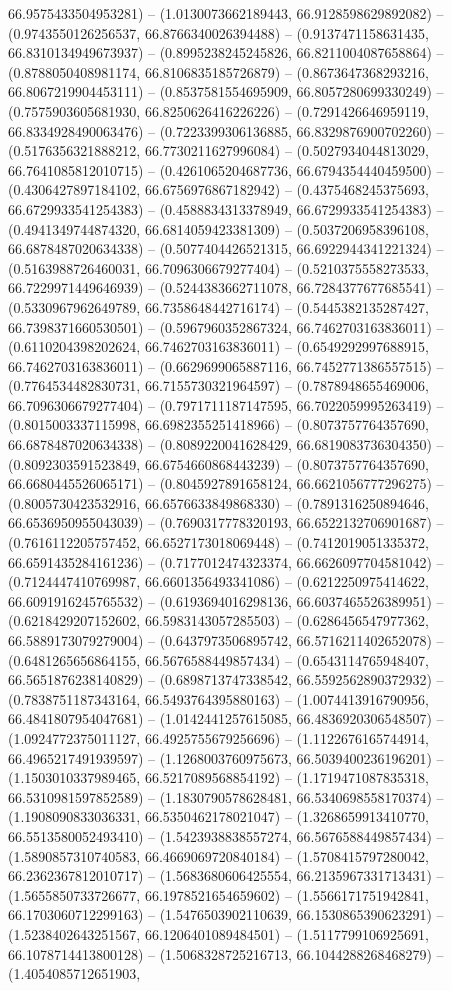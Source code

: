 66.9575433504953281) -- (1.0130073662189443, 66.9128598629892082) -- (0.9743550126256537, 66.8766340026394488) -- (0.9137471158631435, 66.8310134949673937) -- (0.8995238245245826, 66.8211004087658864) -- (0.8788050408981174, 66.8106835185726879) -- (0.8673647368293216, 66.8067219904453111) -- (0.8537581554695909, 66.8057280699330249) -- (0.7575903605681930, 66.8250626416226226) -- (0.7291426646959119, 66.8334928490063476) -- (0.7223399306136885, 66.8329876900702260) -- (0.5176356321888212, 66.7730211627996084) -- (0.5027934044813029, 66.7641085812010715) -- (0.4261065204687736, 66.6794354440459500) -- (0.4306427897184102, 66.6756976867182942) -- (0.4375468245375693, 66.6729933541254383) -- (0.4588834313378949, 66.6729933541254383) -- (0.4941349744874320, 66.6814059423381309) -- (0.5037206958396108, 66.6878487020634338) -- (0.5077404426521315, 66.6922944341221324) -- (0.5163988726460031, 66.7096306679277404) -- (0.5210375558273533, 66.7229971449646939) -- (0.5244383662711078, 66.7284377677685541) -- (0.5330967962649789, 66.7358648442716174) -- (0.5445382135287427, 66.7398371660530501) -- (0.5967960352867324, 66.7462703163836011) -- (0.6110204398202624, 66.7462703163836011) -- (0.6549292997688915, 66.7462703163836011) -- (0.6629699065887116, 66.7452771386557515) -- (0.7764534482830731, 66.7155730321964597) -- (0.7878948655469006, 66.7096306679277404) -- (0.7971711187147595, 66.7022059995263419) -- (0.8015003337115998, 66.6982355251418966) -- (0.8073757764357690, 66.6878487020634338) -- (0.8089220041628429, 66.6819083736304350) -- (0.8092303591523849, 66.6754660868443239) -- (0.8073757764357690, 66.6680445526065171) -- (0.8045927891658124, 66.6621056777296275) -- (0.8005730423532916, 66.6576633849868330) -- (0.7891316250894646, 66.6536950955043039) -- (0.7690317778320193, 66.6522132706901687) -- (0.7616112205757452, 66.6527173018069448) -- (0.7412019051335372, 66.6591435284161236) -- (0.7177012474323374, 66.6626097704581042) -- (0.7124447410769987, 66.6601356493341086) -- (0.6212250975414622, 66.6091916245765532) -- (0.6193694016298136, 66.6037465526389951) -- (0.6218429207152602, 66.5983143057285503) -- (0.6286456547977362, 66.5889173079279004) -- (0.6437973506895742, 66.5716211402652078) -- (0.6481265656864155, 66.5676588449857434) -- (0.6543114765948407, 66.5651876238140829) -- (0.6898713747338542, 66.5592562890372932) -- (0.7838751187343164, 66.5493764395880163) -- (1.0074413916790956, 66.4841807954047681) -- (1.0142441257615085, 66.4836920306548507) -- (1.0924772375011127, 66.4925755679256696) -- (1.1122676165744914, 66.4965217491939597) -- (1.1268003760975673, 66.5039400236196201) -- (1.1503010337989465, 66.5217089568854192) -- (1.1719471087835318, 66.5310981597852589) -- (1.1830790578628481, 66.5340698558170374) -- (1.1908090833036331, 66.5350462178021047) -- (1.3268659913410770, 66.5513580052493410) -- (1.5423938838557274, 66.5676588449857434) -- (1.5890857310740583, 66.4669069720840184) -- (1.5708415797280042, 66.2362367812010717) -- (1.5683680606425554, 66.2135967331713431) -- (1.5655850733726677, 66.1978521654659602) -- (1.5566171751942841, 66.1703060712299163) -- (1.5476503902110639, 66.1530865390623291) -- (1.5238402643251567, 66.1206401089484501) -- (1.5117799106925691, 66.1078714413800128) -- (1.5068328725216713, 66.1044288268468279) -- (1.4054085712651903, 